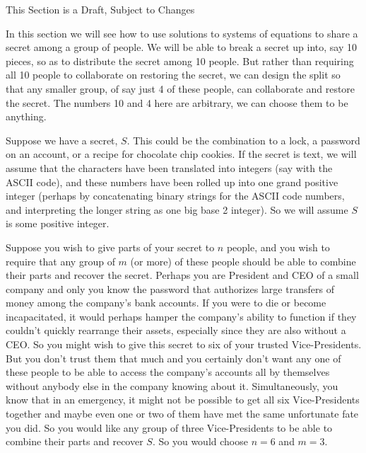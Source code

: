 %
{\sc\large This Section is a Draft, Subject to Changes}\par\bigskip
%
In this section we will see how to use solutions to systems of equations to share a secret among a group of people.  We will be able to break a secret up into, say 10 pieces, so as to distribute the secret among 10 people.  But rather than requiring all 10 people to collaborate on restoring the secret, we can design the split so that any smaller group, of say just 4 of these people, can collaborate and restore the secret.  The numbers 10 and 4 here are arbitrary, we can choose them to be anything.\par
%
Suppose we have a secret, $S$.  This could be the combination to a lock, a password on an account, or a recipe for chocolate chip cookies.  If the secret is text, we will assume that the characters have been translated into integers (say with the ASCII code), and these numbers have been rolled up into one grand positive integer (perhaps by concatenating binary strings for the ASCII code numbers, and interpreting the longer string as one big base 2 integer).  So we will assume $S$ is some positive integer.\par
%
Suppose you wish to give parts of your secret to $n$ people, and you wish to require that any group of $m$ (or more) of these people should be able to combine their parts and recover the secret.  Perhaps you are President and CEO of a small company and only you know the password that authorizes large transfers of money among the company's bank accounts.  If you were to die or become incapacitated, it would perhaps hamper the company's ability to function if they couldn't quickly rearrange their assets, especially since they are also without a CEO.  So you might wish to give this secret to six of your trusted Vice-Presidents.  But you don't trust them that much and you certainly don't want any one of these people to be able to access the company's accounts all by themselves without anybody else in the company knowing about it.  Simultaneously, you know that in an emergency, it might not be possible to get all six Vice-Presidents together and maybe even one or two of them have met the same unfortunate fate you did.  So you would like any group of three Vice-Presidents to be able to combine their parts and recover $S$.  So you would choose $n=6$ and $m=3$.\par
